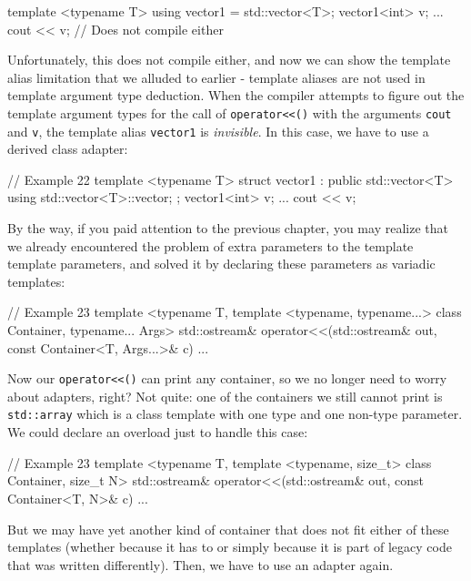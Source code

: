 \begin{code}
template <typename T> using vector1 = std::vector<T>;
vector1<int> v;
...
cout << v; // Does not compile either
\end{code}

Unfortunately, this does not compile either, and now we can show the template alias limitation that we alluded to earlier - template aliases are not used in template argument type deduction. When the compiler attempts to figure out the template argument types for the call of \texttt{operator\textless{}\textless{}()} with the arguments \texttt{cout} and \texttt{v}, the template alias \texttt{vector1} is \emph{invisible}. In this case, we have to use a derived class adapter:

\begin{code}
// Example 22
template <typename T>
struct vector1 : public std::vector<T> {
  using std::vector<T>::vector;
};
vector1<int> v;
...
cout << v;
\end{code}

By the way, if you paid attention to the previous chapter, you may realize that we already encountered the problem of extra parameters to the template template parameters, and solved it by declaring these parameters as variadic templates:

\begin{code}
// Example 23
template <typename T,
  template <typename, typename...> class Container,
  typename... Args>
std::ostream& operator<<(std::ostream& out,
                         const Container<T, Args...>& c) {
  ...
}
\end{code}

Now our \texttt{operator\textless{}\textless{}()} can print any container, so we no longer need to worry about adapters, right? Not quite: one of the containers we still cannot print is \texttt{std::array} which is a class template with one type and one non-type parameter. We could declare an overload just to handle this case:

\begin{code}
// Example 23
template <typename T,
  template <typename, size_t> class Container, size_t N>
std::ostream& operator<<(std::ostream& out,
                         const Container<T, N>& c) {
  ...
}
\end{code}

But we may have yet another kind of container that does not fit either of these templates (whether because it has to or simply because it is part of legacy code that was written differently). Then, we have to use an adapter again.

